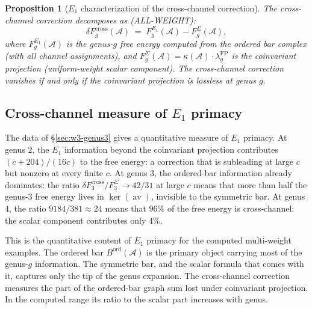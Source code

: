 \documentclass[11pt]{article}
\newtheorem{proposition}[theorem]{Proposition}
\theoremstyle{definition}
\theoremstyle{remark}
\newcommand{\cA}{\mathcal{A}}
\newcommand{\FP}{\mathrm{FP}}
\newcommand{\cross}{\mathrm{cross}}
\DeclareMathOperator{\av}{av}
\DeclareMathOperator{\ord}{ord}
\numberwithin{equation}{section}
\begin{document}
\begin{proposition}[$E_1$ characterization of the cross-channel correction]\label{prop:e1-characterization}
The cross-channel correction decomposes as
\textup{(ALL-WEIGHT)}:
\begin{equation}\label{eq:e1-decomposition}
 \delta F_g^{\cross}(\cA)
 \;=\;
 F_g^{E_1}(\cA) - F_g^{\Sigma}(\cA),
\end{equation}
where $F_g^{E_1}(\cA)$ is the genus-$g$ free energy computed
from the ordered bar complex
\textup{(}with all channel assignments\textup{)}, and
$F_g^{\Sigma}(\cA) = \kappa(\cA) \cdot \lambda_g^{\FP}$
is the coinvariant projection
\textup{(}uniform-weight scalar component\textup{)}.
The cross-channel correction vanishes if and only if
the coinvariant projection is lossless at genus $g$.
\end{proposition}

\subsection{Cross-channel measure of $E_1$ primacy}

The data of \S\ref{sec:w3-genus3} gives a quantitative
measure of $E_1$ primacy.
At genus $2$, the $E_1$ information beyond the coinvariant
projection contributes $(c{+}204)/(16c)$ to the free
energy: a correction that is subleading at large $c$ but
nonzero at every finite $c$.
At genus $3$, the ordered-bar information already dominates:
the ratio $\delta F_3^{\cross}/F_3^{\Sigma} \to 42/31$
at large $c$ means that more than half the genus-$3$ free
energy lives in $\ker(\av)$, invisible to the symmetric bar.
At genus $4$, the ratio $9184/381 \approx 24$ means that
$96\%$ of the free energy is cross-channel: the scalar
component contributes only $4\%$.

This is the quantitative content of $E_1$ primacy for the computed
multi-weight examples.
The ordered bar $B^{\ord}(\cA)$ is the primary object carrying
most of the genus-$g$ information.
The symmetric bar, and the scalar formula that comes with it,
captures only the tip of the genus expansion.
The cross-channel correction measures the part of the ordered-bar
graph sum lost under coinvariant projection. In the computed range its
ratio to the scalar part increases with genus.
\end{document}
